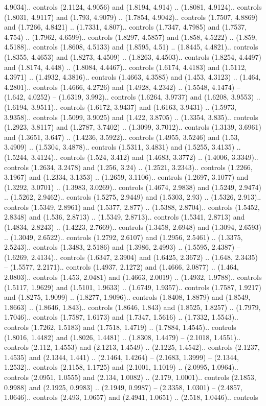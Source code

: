 4.9034).. controls (2.1124, 4.9056) and (1.8194, 4.914) .. (1.8081, 4.9124).. controls (1.8031, 4.9117) and (1.793, 4.9079) .. (1.7854, 4.9042).. controls (1.7507, 4.8869) and (1.7266, 4.8421) .. (1.7331, 4.807).. controls (1.7347, 4.7985) and (1.7537, 4.754) .. (1.7962, 4.6599).. controls (1.8297, 4.5857) and (1.858, 4.5222) .. (1.859, 4.5188).. controls (1.8608, 4.5133) and (1.8595, 4.51) .. (1.8445, 4.4821).. controls (1.8355, 4.4653) and (1.8273, 4.4509) .. (1.8263, 4.4503).. controls (1.8254, 4.4497) and (1.8174, 4.448) .. (1.8084, 4.4467).. controls (1.6174, 4.4183) and (1.5112, 4.3971) .. (1.4932, 4.3816).. controls (1.4663, 4.3585) and (1.453, 4.3123) .. (1.464, 4.2801).. controls (1.4666, 4.2726) and (1.4928, 4.2342) .. (1.5548, 4.1474) -- (1.642, 4.0252) -- (1.6319, 3.992).. controls (1.6264, 3.9737) and (1.6208, 3.9553) .. (1.6194, 3.9511).. controls (1.6172, 3.9437) and (1.6163, 3.9431) .. (1.5973, 3.9358).. controls (1.5099, 3.9025) and (1.422, 3.8705) .. (1.3354, 3.835).. controls (1.2923, 3.8117) and (1.2787, 3.7402) .. (1.3099, 3.7012).. controls (1.3139, 3.6961) and (1.3651, 3.647) .. (1.4236, 3.5922).. controls (1.4955, 3.5246) and (1.53, 3.4909) .. (1.5304, 3.4878).. controls (1.5311, 3.4831) and (1.5255, 3.4135) .. (1.5244, 3.4124).. controls (1.524, 3.412) and (1.4683, 3.3772) .. (1.4006, 3.3349).. controls (1.2634, 3.2478) and (1.256, 3.24) .. (1.2521, 3.2343).. controls (1.2266, 3.1967) and (1.2334, 3.1353) .. (1.2659, 3.1106).. controls (1.2697, 3.1077) and (1.3292, 3.0701) .. (1.3983, 3.0269).. controls (1.4674, 2.9838) and (1.5249, 2.9474) .. (1.5262, 2.9462).. controls (1.5275, 2.9449) and (1.5303, 2.93) .. (1.5326, 2.913).. controls (1.5349, 2.8961) and (1.5377, 2.877) .. (1.5388, 2.8704).. controls (1.5452, 2.8348) and (1.536, 2.8713) .. (1.5349, 2.8713).. controls (1.5341, 2.8713) and (1.4834, 2.8243) .. (1.4223, 2.7669).. controls (1.3458, 2.6948) and (1.3094, 2.6593) .. (1.3049, 2.6522).. controls (1.2792, 2.6107) and (1.2956, 2.5461) .. (1.3375, 2.5243).. controls (1.3483, 2.5186) and (1.3986, 2.4993) .. (1.5595, 2.4387) -- (1.6269, 2.4134).. controls (1.6347, 2.3904) and (1.6425, 2.3672) .. (1.648, 2.3435) -- (1.5577, 2.2171).. controls (1.4937, 2.1272) and (1.4666, 2.0877) .. (1.464, 2.0803).. controls (1.453, 2.0481) and (1.4663, 2.0019) .. (1.4932, 1.9788).. controls (1.5117, 1.9629) and (1.5101, 1.9633) .. (1.6749, 1.9357).. controls (1.7587, 1.9217) and (1.8275, 1.9099) .. (1.8277, 1.9096).. controls (1.8408, 1.8879) and (1.8549, 1.8663) .. (1.8646, 1.843).. controls (1.8646, 1.843) and (1.8525, 1.8257) .. (1.7979, 1.7046).. controls (1.7587, 1.6173) and (1.7347, 1.5616) .. (1.7332, 1.5543).. controls (1.7262, 1.5183) and (1.7518, 1.4719) .. (1.7884, 1.4545).. controls (1.8016, 1.4482) and (1.8026, 1.4481) .. (1.8308, 1.4479) -- (2.1018, 1.4551).. controls (2.112, 1.4553) and (2.1213, 1.4549) .. (2.1225, 1.4542).. controls (2.1237, 1.4535) and (2.1344, 1.441) .. (2.1464, 1.4264) -- (2.1683, 1.3999) -- (2.1344, 1.2532).. controls (2.1158, 1.1725) and (2.1001, 1.1019) .. (2.0995, 1.0964).. controls (2.0951, 1.0555) and (2.134, 1.0082) .. (2.179, 1.0001).. controls (2.1853, 0.9988) and (2.1925, 0.9983) .. (2.1949, 0.9987) -- (2.3358, 1.0301) -- (2.4857, 1.0646).. controls (2.493, 1.0657) and (2.4941, 1.0651) .. (2.518, 1.0446).. controls 